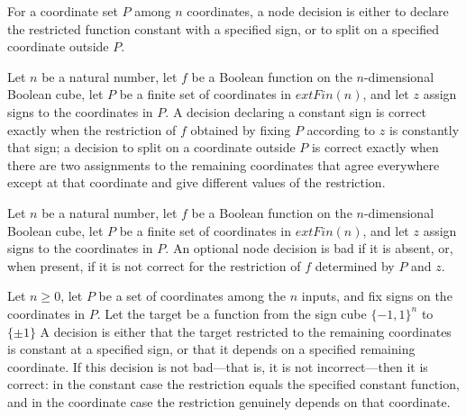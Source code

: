 \begin{definition}
\label{FABL.JuntaNodeDecision}
\leanok
{}
For a coordinate set $P$ among $n$ coordinates, a node decision is either to declare the
restricted function constant with a specified sign, or to split on a specified
coordinate outside $P$.
\end{definition}

\begin{definition}
\label{FABL.JuntaNodeDecision.IsCorrect}
\leanok
{}
Let $n$ be a natural number, let $f$ be a Boolean function on the $n$-dimensional
Boolean cube, let $P$ be a finite set of coordinates in $	ext{Fin}(n)$, and let $z$
assign signs to the coordinates in $P$. A decision declaring a constant sign is correct
exactly when the restriction of $f$ obtained by fixing $P$ according to $z$ is
constantly that sign; a decision to split on a coordinate outside $P$ is correct exactly
when there are two assignments to the remaining coordinates that agree everywhere except
at that coordinate and give different values of the restriction.
\end{definition}

\begin{definition}
\label{FABL.JuntaNodeDecision.IsBad}
\leanok
{}
Let $n$ be a natural number, let $f$ be a Boolean function on the $n$-dimensional
Boolean cube, let $P$ be a finite set of coordinates in $	ext{Fin}(n)$, and let $z$
assign signs to the coordinates in $P$. An optional node decision is bad if it is
absent, or, when present, if it is not correct for the restriction of $f$ determined by
$P$ and $z$.
\end{definition}

\begin{theorem}
\label{FABL.JuntaNodeDecision.isCorrect_of_not_isBad}
\leanok
{}
Let $n\ge 0$, let $P$ be a set of coordinates among the $n$ inputs, and fix signs on the
coordinates in $P$. Let the target be a function from the sign cube $\{-1,1\}^n$ to
$\{\pm1\}$ A decision is either that the target restricted to the remaining
coordinates is constant at a specified sign, or that it depends on a specified remaining
coordinate. If this decision is not bad—that is, it is not incorrect—then it is correct:
in the constant case the restriction equals the specified constant function, and in the
coordinate case the restriction genuinely depends on that coordinate.
\end{theorem}

